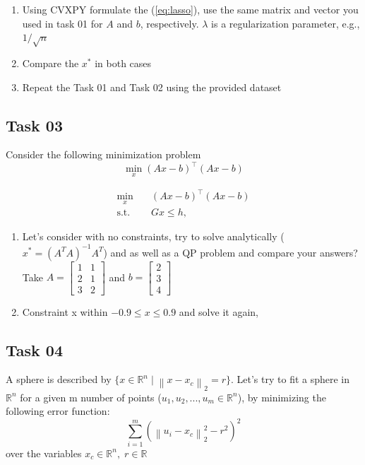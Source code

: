\documentclass[12pt]{article}%
\begin{document}
\begin{enumerate}
    \item Using CVXPY formulate the (\ref{eq:lasso}), use the same matrix and vector you used in task 01 for $A$ and $b$, respectively. $\lambda$ is a regularization parameter, e.g., $1/\sqrt{n}$ 


    \item Compare the $x^*$ in both cases
    \item Repeat the Task 01 and Task 02 using the provided dataset 
\end{enumerate}

\subsection{Task 03}
Consider the following minimization problem
\begin{equation}
    \min_x (Ax-b)^{\top} (Ax-b)
\end{equation}

\begin{equation}\label{eq:01}
\begin{aligned}
 \min_{x} \quad & (Ax-b)^{\top} (Ax-b) \\
\textrm{s.t.} \quad  & Gx \leq h,
\end{aligned}
\end{equation}
\begin{enumerate}
    \item Let's consider with no constraints, try to solve analytically ($x^* = (A^TA)^{ -1}A^T$) and as well as a QP problem and compare your answers? Take $A=\begin{bmatrix}
1 &1 \\ 
2 & 1\\ 
3 & 2
\end{bmatrix} $ and $b = \begin{bmatrix}
2\\ 
3\\ 
4
\end{bmatrix}$
    \item Constraint x within $-0.9 \leq x \leq 0.9$ and solve it again, 
\end{enumerate}

\subsection{Task 04}
A sphere is described by $\{ x \in \mathbb{R}^n \mid \left \| x - x_c \right \|_2 = r\}$. Let's try to fit a sphere in $\mathbb{R}^n$ for a given m number of points ($u_1, u_2,...,u_m \in \mathbb{R}^n$), by minimizing the following error function:
\begin{equation}
    \sum_{i=1}^m (\left \| u_i -x_c \right \|_2^2-r^2)^2
\end{equation} over the variables $x_c \in \mathbb{R}^n, \; r \in \mathbb{R}$
\end{document}
